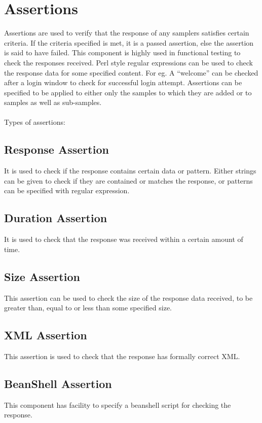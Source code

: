 \documentclass[12pt]{book}
\begin{document}
\section{Assertions}
Assertions are used to verify that the response of any samplers satisfies certain criteria.
If the criteria specified is met, it is a passed assertion, else the assertion is said to have failed.
This component is highly used in functional testing to check the responses received. Perl style regular 
expressions can be used to check the response data for some specified content. For eg. A “welcome” can be checked 
after a login window to check for successful login attempt. Assertions can be specified to be applied to either only
the samples to which they are added or to samples as well as sub-samples. \cite{Ehh} \cite{Jmeter} \cite{Manual}\\
\\
Types of assertions:   
 \subsection{Response Assertion}
 It is used to check if the response contains certain data or pattern.
 Either strings can be given to check if they are contained or matches the response, or 
 patterns can be specified with regular expression.
 
 \subsection{Duration Assertion}
 It is used to check that the response was received within a certain amount of time.
 
 \subsection{Size Assertion}
 This assertion can be used to check the size of the response data received, to be greater than, equal to or less than some specified size.
 
 \subsection{XML Assertion}
 This assertion is used to check that the response has formally correct XML. 
 
 \subsection{BeanShell Assertion}
 This component has facility to specify a beanshell script for checking the response.
 
\end{document}
